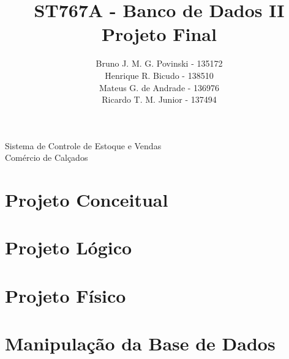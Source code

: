 \documentclass[a4paper,12pt]{article}
\title{ST767A - Banco de Dados II \\ Projeto Final}
\author{Bruno J. M. G. Povinski - 135172 \\ Henrique R. Bicudo - 138510 \\ Mateus G. de Andrade - 136976 \\ Ricardo T. M. Junior - 137494}
\date{}
\begin{document}
	\maketitle
	
	\begin{center}
		\begin{Large}
			Sistema de Controle de Estoque e Vendas \\ Comércio de Calçados
		\end{Large}
	\end{center}
	
	\section{Projeto Conceitual}
	\section{Projeto Lógico}
	\section{Projeto Físico}
	\section{Manipulação da Base de Dados}
\end{document}
